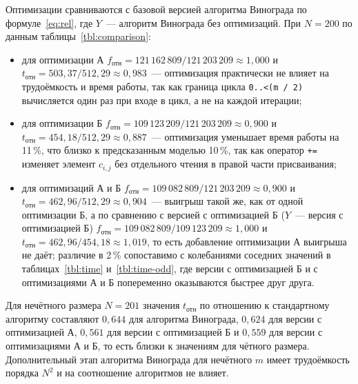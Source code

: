 Оптимизации сравниваются с базовой версией алгоритма Винограда по формуле~\eqref{eq:rel}, где $Y$~--- алгоритм Винограда без оптимизаций. При $N = 200$ по данным таблицы~\ref{tbl:comparison}:
\begin{itemize}
	\item для оптимизации А $f_{\text{отн}} = 121\,162\,809 / 121\,203\,209 \approx 1{,}000$ и $t_{\text{отн}} = 503{,}37 / 512{,}29 \approx 0{,}983$~--- оптимизация практически не влияет на трудоёмкость и время работы, так как граница цикла \texttt{0..<(m / 2)} вычисляется один раз при входе в цикл, а не на каждой итерации;
	\item для оптимизации Б $f_{\text{отн}} = 109\,123\,209 / 121\,203\,209 \approx 0{,}900$ и $t_{\text{отн}} = 454{,}18 / 512{,}29 \approx 0{,}887$~--- оптимизация уменьшает время работы на 11\,\%, что близко к предсказанным моделью 10\,\%, так как оператор \texttt{+=} изменяет элемент $c_{i,j}$ без отдельного чтения в правой части присваивания;
	\item для оптимизаций А и Б $f_{\text{отн}} = 109\,082\,809 / 121\,203\,209 \approx 0{,}900$ и $t_{\text{отн}} = 462{,}96 / 512{,}29 \approx 0{,}904$~--- выигрыш такой же, как от одной оптимизации Б, а по сравнению с версией с оптимизацией Б ($Y$~--- версия с оптимизацией Б) $f_{\text{отн}} = 109\,082\,809 / 109\,123\,209 \approx 1{,}000$ и $t_{\text{отн}} = 462{,}96 / 454{,}18 \approx 1{,}019$, то есть добавление оптимизации А выигрыша не даёт; различие в 2\,\% сопоставимо с колебаниями соседних значений в таблицах~\ref{tbl:time} и~\ref{tbl:time-odd}, где версии с оптимизацией Б и с оптимизациями А и Б попеременно оказываются быстрее друг друга.
\end{itemize}

Для нечётного размера $N = 201$ значения $t_{\text{отн}}$ по отношению к стандартному алгоритму составляют $0{,}644$ для алгоритма Винограда, $0{,}624$ для версии с оптимизацией А, $0{,}561$ для версии с оптимизацией Б и $0{,}559$ для версии с оптимизациями А и Б, то есть близки к значениям для чётного размера. Дополнительный этап алгоритма Винограда для нечётного $m$ имеет трудоёмкость порядка $N^2$ и на соотношение алгоритмов не влияет.

